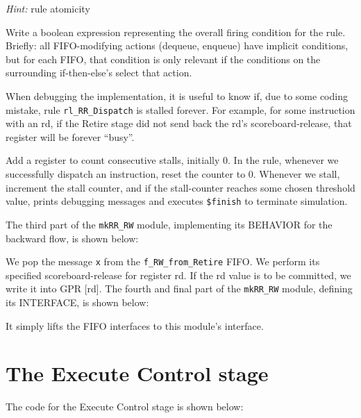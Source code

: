 \emph{Hint:} rule atomicity

\Exercise

Write a boolean expression representing the overall firing condition
for the rule.  Briefly: all FIFO-modifying actions (dequeue, enqueue)
have implicit conditions, but for each FIFO, that condition is only
relevant if the conditions on the surrounding if-then-else's select
that action.

\Exercise

When debugging the implementation, it is useful to know if, due to
some coding mistake, rule \verb|rl_RR_Dispatch| is stalled forever.
For example, for some instruction with an rd, if the Retire stage did
not send back the rd's scoreboard-release, that register will be
forever ``busy''.

Add a register to count consecutive stalls, initially 0.  In the rule,
whenever we successfully dispatch an instruction, reset the counter to
0.  Whenever we stall, increment the stall counter, and if the
stall-counter reaches some chosen threshold value, prints debugging
messages and executes \verb|$finish| to terminate simulation.

\Endexercise

The third part of the \verb|mkRR_RW| module, implementing its BEHAVIOR
for the backward flow, is shown below:



We pop the message \verb|x| from the \verb|f_RW_from_Retire| FIFO.  We
perform its specified scoreboard-release for register rd.  If the rd
value is to be committed, we write it into GPR [rd].  The fourth and
final part of the \verb|mkRR_RW| module, defining its INTERFACE, is
shown below:



It simply lifts the FIFO interfaces to this module's interface.


\section{The Execute Control stage}

\label{Sec_Fife_Control_stage}

The code for the Execute Control stage is shown below:

